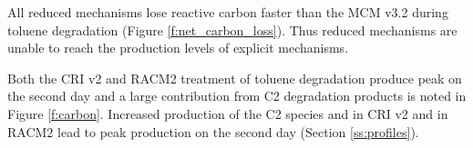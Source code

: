 All reduced mechanisms lose reactive carbon faster than the MCM v3.2 during toluene degradation (Figure \ref{f:net_carbon_loss}).
Thus reduced mechanisms are unable to reach the  production levels of explicit mechanisms.

Both the CRI v2 and RACM2 treatment of toluene degradation produce peak  on the second day and a large contribution from C2 degradation products is noted in Figure \ref{f:carbon}.
Increased  production of the C2 species  and  in CRI v2 and  in RACM2 lead to peak  production on the second day (Section \ref{ss:profiles}).
